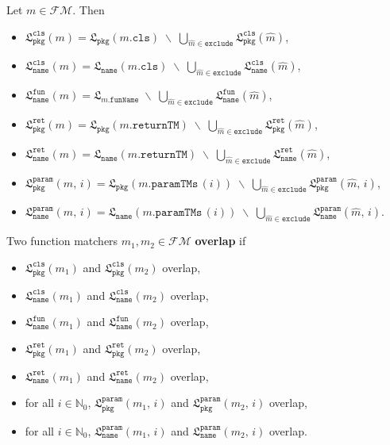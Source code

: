 \documentclass{article}
\newcommand{\lang}{\mathfrak{L}}
\begin{document}
Let $m \in \mathcal{FM}$. Then
\begin{itemize}
    \item $\lang_\texttt{pkg}^\texttt{cls}(m) = \lang_\texttt{pkg}(m.\texttt{cls}) \;\backslash\; \bigcup\limits_{\hat{m} \in \texttt{exclude}} \lang_\texttt{pkg}^\texttt{cls}(\hat{m})$,

    \item $\lang_\texttt{name}^\texttt{cls}(m) = \lang_\texttt{name}(m.\texttt{cls}) \;\backslash\; \bigcup\limits_{\hat{m} \in \texttt{exclude}} \lang_\texttt{name}^\texttt{cls}(\hat{m})$,

    \item $\lang_\texttt{name}^\texttt{fun}(m) = \lang_{m.\texttt{funName}} \;\backslash\; \bigcup\limits_{\hat{m} \in \texttt{exclude}} \lang_\texttt{name}^\texttt{fun}(\hat{m})$,

    \item $\lang_\texttt{pkg}^\texttt{ret}(m) = \lang_\texttt{pkg}(m.\texttt{returnTM}) \;\backslash\; \bigcup\limits_{\hat{m} \in \texttt{exclude}} \lang_\texttt{pkg}^\texttt{ret}(\hat{m})$,

    \item $\lang_\texttt{name}^\texttt{ret}(m) = \lang_\texttt{name}(m.\texttt{returnTM}) \;\backslash\; \bigcup\limits_{\hat{m} \in \texttt{exclude}} \lang_\texttt{name}^\texttt{ret}(\hat{m})$,

    \item $\lang_\texttt{pkg}^\texttt{param}(m,\, i) = \lang_\texttt{pkg}(m.\texttt{paramTMs}\,(i)) \;\backslash\; \bigcup\limits_{\hat{m} \in \texttt{exclude}} \lang_\texttt{pkg}^\texttt{param}(\hat{m},\, i)$,

    \item $\lang_\texttt{name}^\texttt{param}(m,\, i) = \lang_\texttt{name}(m.\texttt{paramTMs}\,(i)) \;\backslash\; \bigcup\limits_{\hat{m} \in \texttt{exclude}} \lang_\texttt{name}^\texttt{param}(\hat{m},\, i)$.
    \end{itemize}

Two function matchers $m_1, m_2 \in \mathcal{FM}$ \textbf{overlap} if
\begin{itemize}
    \item $\lang_\texttt{pkg}^\texttt{cls}(m_1)$ and $\lang_\texttt{pkg}^\texttt{cls}(m_2)$ overlap,
    \item $\lang_\texttt{name}^\texttt{cls}(m_1)$ and $\lang_\texttt{name}^\texttt{cls}(m_2)$ overlap,
    \item $\lang_\texttt{name}^\texttt{fun}(m_1)$ and $\lang_\texttt{name}^\texttt{fun}(m_2)$ overlap,
    \item $\lang_\texttt{pkg}^\texttt{ret}(m_1)$ and $\lang_\texttt{pkg}^\texttt{ret}(m_2)$ overlap,
    \item $\lang_\texttt{name}^\texttt{ret}(m_1)$ and $\lang_\texttt{name}^\texttt{ret}(m_2)$ overlap,
    \item for all $i \in \mathbb{N}_0$, $\lang_\texttt{pkg}^\texttt{param}(m_1,\, i)$ and $\lang_\texttt{pkg}^\texttt{param}(m_2,\, i)$ overlap,
    \item for all $i \in \mathbb{N}_0$, $\lang_\texttt{name}^\texttt{param}(m_1,\, i)$ and $\lang_\texttt{name}^\texttt{param}(m_2,\, i)$ overlap.
\end{itemize}
\end{document}
